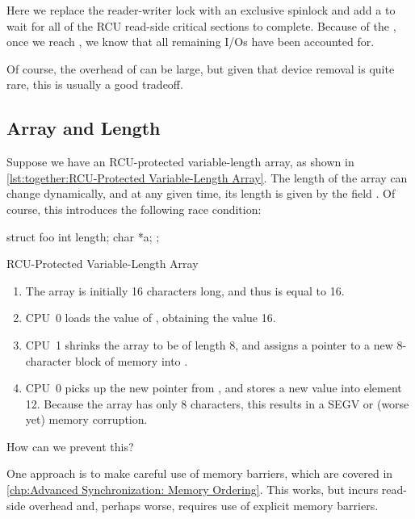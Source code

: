 \begin{fcvref}
Here we replace the reader-writer lock with an exclusive spinlock and
add a  to wait for all of the RCU read-side
critical sections to complete.
Because of the ,
once we reach ,
we know that all remaining I/Os have been accounted for.

Of course, the overhead of  can be large,
but given that device removal is quite rare, this is usually a good
tradeoff.
\end{fcvref}

\subsection{Array and Length}
\label{sec:together:Array and Length}

Suppose we have an RCU-protected variable-length array, as shown in
\cref{lst:together:RCU-Protected Variable-Length Array}.
The length of the array  can change dynamically, and at any
given time, its length is given by the field .
Of course, this introduces the following race condition:

\begin{listing}[tbp]
\begin{VerbatimL}[tabsize=8]
struct foo {
	int length;
	char *a;
};
\end{VerbatimL}
\caption{RCU-Protected Variable-Length Array}
\label{lst:together:RCU-Protected Variable-Length Array}
\end{listing}

\begin{enumerate}
\item	The array is initially 16 characters long, and thus 
	is equal to 16.
\item	CPU~0 loads the value of , obtaining the value 16.
\item	CPU~1 shrinks the array to be of length 8, and assigns a pointer
	to a new 8-character block of memory into .
\item	CPU~0 picks up the new pointer from , and stores a
	new value into element 12.
	Because the array has only 8 characters, this results in
	a SEGV or (worse yet) memory corruption.
\end{enumerate}

How can we prevent this?

One approach is to make careful use of memory barriers, which are
covered in \cref{chp:Advanced Synchronization: Memory Ordering}.
This works, but incurs read-side overhead and, perhaps worse, requires
use of explicit memory barriers.

